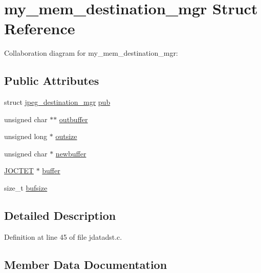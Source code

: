 \hypertarget{structmy__mem__destination__mgr}{}\section{my\+\_\+mem\+\_\+destination\+\_\+mgr Struct Reference}
\label{structmy__mem__destination__mgr}


Collaboration diagram for my\+\_\+mem\+\_\+destination\+\_\+mgr\+:
\subsection*{Public Attributes}
\begin{DoxyCompactItemize}
\item 
struct \mbox{\hyperlink{structjpeg__destination__mgr}{jpeg\+\_\+destination\+\_\+mgr}} \mbox{\hyperlink{structmy__mem__destination__mgr_a5e0cd1a96147d183b7338007a7716961}{pub}}
\item 
unsigned char $\ast$$\ast$ \mbox{\hyperlink{structmy__mem__destination__mgr_a61dceebdaf153d422514527aa0e1bf6e}{outbuffer}}
\item 
unsigned long $\ast$ \mbox{\hyperlink{structmy__mem__destination__mgr_ac4bcefbee84e8b603a57dbb347cc2351}{outsize}}
\item 
unsigned char $\ast$ \mbox{\hyperlink{structmy__mem__destination__mgr_ac0b918872c851937dd8751d1a8105220}{newbuffer}}
\item 
\mbox{\hyperlink{jmorecfg_8h_a356ad249f20e691b520da439f92cccbc}{J\+O\+C\+T\+ET}} $\ast$ \mbox{\hyperlink{structmy__mem__destination__mgr_a183510a848f0a8d421a541df6ce6acac}{buffer}}
\item 
size\+\_\+t \mbox{\hyperlink{structmy__mem__destination__mgr_a216685d583a991f4757f4e3f6a5de675}{bufsize}}
\end{DoxyCompactItemize}


\subsection{Detailed Description}


Definition at line 45 of file jdatadst.\+c.



\subsection{Member Data Documentation}
\mbox{\label{structmy__mem__destination__mgr_a183510a848f0a8d421a541df6ce6acac}} 
